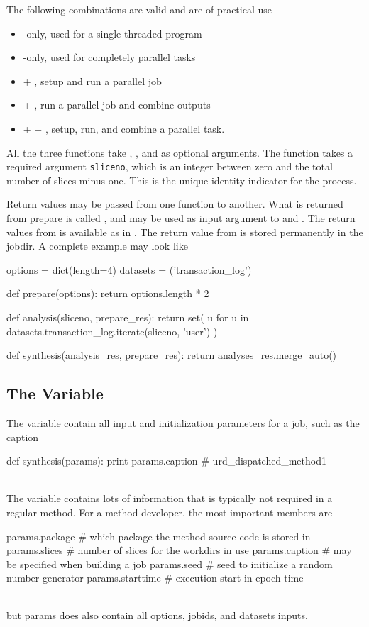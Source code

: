 The following combinations are valid and are of practical use
\begin{itemize}
\item \synthesis-only, used for a single threaded program
\item \analysis-only, used for completely parallel tasks
\item \prepare + \analysis, setup and run a parallel job
\item \analysis + \synthesis, run a parallel job and combine outputs
\item \prepare + \analysis + \synthesis, setup, run, and combine a
  parallel task.
\end{itemize}
All the three functions take \options, \jobids, and \datasets as
optional arguments.  The \analysis function takes a required argument
\texttt{sliceno}, which is an integer between zero and the total
number of slices minus one.  This is the unique identity indicator for
the \analysis process.

Return values may be passed from one function to another.  What is
returned from prepare is called \prepareres, and may be used as input
argument to \analysis and \synthesis.  The return values from
\analysis is available as \analysisres in \synthesis.  The return
value from \synthesis is stored permanently in the jobdir.  A complete
example may look like
\\
\begin{python}
options = dict(length=4)
datasets = ('transaction_log')

def prepare(options):
  return options.length * 2

def analysis(sliceno, prepare_res):
  return set(
    u for u in datasets.transaction_log.iterate(sliceno, 'user')
  )

def synthesis(analysis_res, prepare_res):
   return analyses_res.merge_auto()
\end{python}


\subsection{The \params Variable }
The \params variable contain all input and initialization parameters
for a job, such as the caption
\\
\begin{python}
def synthesis(params):
  print params.caption
# urd_dispatched_method1
\end{python}
\\
The \params variable contains lots of information that is typically
not required in a regular method.  For a method developer, the most
important members are
\\
\begin{python}
params.package     # which package the method source code is stored in
params.slices      # number of slices for the workdirs in use
params.caption     # may be specified when building a job
params.seed        # seed to initialize a random number generator
params.starttime   # execution start in epoch time
\end{python}
\\
but params does also contain all options, jobids, and datasets inputs.



